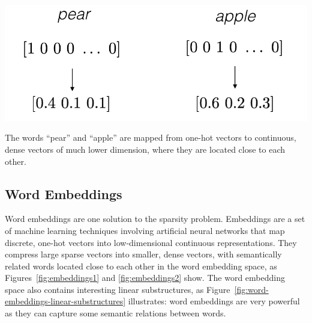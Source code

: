 \documentclass[justified, marginals=justified]{tufte-handout}
\begin{document}
\begin{marginfigure}[0.5cm]
  \includegraphics[width=\linewidth]{embeddings1.png}
  \caption{The words ``pear'' and ``apple'' are mapped from one-hot vectors to continuous, dense vectors of much lower dimension, where they are located close to each other.}
  \label{fig:embeddings1}
\end{marginfigure}

\subsection{Word Embeddings}\label{sec:word-embeddings}

Word embeddings are one solution to the sparsity problem. Embeddings are a set of machine learning techniques involving artificial neural networks that map discrete, one-hot vectors into low-dimensional continuous representations. They compress large sparse vectors into smaller, dense vectors, with semantically related words located close to each other in the word embedding space, as Figures~\ref{fig:embeddings1} and \ref{fig:embeddings2} show. The word embedding space also contains interesting linear substructures, as Figure~\ref{fig:word-embeddings-linear-substructures} illustrates: word embeddings are very powerful as they can capture some semantic relations between words.
\end{document}
